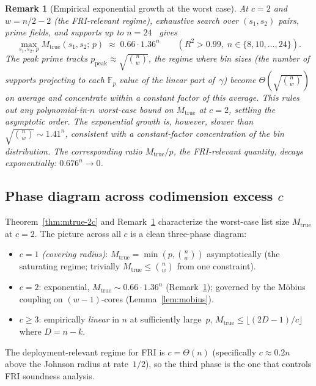 \documentclass[11pt]{article}
\newtheorem{remark}[theorem]{Remark}
\newcommand{\FF}{\mathbb{F}}
\begin{document}
\begin{remark}[Empirical exponential growth at the worst case]
\label{rem:exp-growth}
At $c = 2$ and $w = n/2 - 2$ (the FRI-relevant regime), exhaustive search over $(s_1, s_2)$ pairs, prime fields, and supports up to $n = 24$~\cite{CompanionRepo} gives
\[
   \max_{s_1, s_2,\,p} M_{\mathrm{true}}(s_1, s_2;\, p) \;\approx\; 0.66 \cdot 1.36^{n}
   \qquad (R^2 > 0.99,\; n \in \{8, 10, \ldots, 24\}).
\]
The peak prime tracks $p_{\mathrm{peak}} \approx \sqrt{\binom{n}{w}}$, the regime where bin sizes (the number of supports projecting to each $\FF_p$ value of the linear part of~$\gamma$) become $\Theta(\sqrt{\binom{n}{w}})$ on average and concentrate within a constant factor of this average. This rules out any polynomial-in-$n$ worst-case bound on $M_{\mathrm{true}}$ at $c = 2$, settling the asymptotic order. The exponential growth is, however, slower than $\sqrt{\binom{n}{w}} {\sim} 1.41^{n}$, consistent with a constant-factor concentration of the bin distribution. The corresponding ratio $M_{\mathrm{true}}/p$, the FRI-relevant quantity, decays exponentially: $0.676^n \to 0$.
\end{remark}

\subsection{Phase diagram across codimension excess $c$}
\label{sec:phase-diagram}

Theorem~\ref{thm:mtrue-2c} and Remark~\ref{rem:exp-growth} characterize the
worst-case list size $M_{\mathrm{true}}$ at $c = 2$. The picture across all
$c$ is a clean three-phase diagram:
\begin{itemize}[nosep]
\item \emph{$c = 1$ (covering radius)}: $M_{\mathrm{true}} = \min(p, \binom{n}{w})$ asymptotically (the saturating regime; trivially $M_{\mathrm{true}} \leq \binom{n}{w}$ from one constraint).
\item \emph{$c = 2$}: exponential, $M_{\mathrm{true}} {\sim} 0.66 \cdot 1.36^n$ (Remark~\ref{rem:exp-growth}); governed by the M\"obius coupling on $(w{-}1)$-cores (Lemma~\ref{lem:mobius}).
\item \emph{$c \geq 3$}: empirically \emph{linear} in $n$ at sufficiently large~$p$, $M_{\mathrm{true}} \leq \lfloor (2D - 1)/c\rfloor$ where $D = n - k$.
\end{itemize}

The deployment-relevant regime for FRI is $c = \Theta(n)$ (specifically $c \approx 0.2n$ above the Johnson radius at rate~$1/2$), so the third phase is the one that controls FRI soundness analysis.
\end{document}
